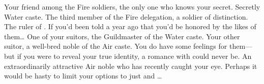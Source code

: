 \documentclass[char]{iron}
\begin{document}
\begin{contacts}
\contact{\cLieutenant{}} Your friend among the Fire soldiers, the only one
who knows your secret.  Secretly Water caste.
\contact{\cRealPriest{}} The third member of the Fire delegation, a soldier
of distinction.
\contact{\cRoyalty{}} The ruler of \sHomeCountry{}.  If you'd been told
a year ago that you'd be honored by the likes of them\ldots{}
\contact{\cGuildmaster{}} One of your suitors, the Guildmaster of the Water caste.
\contact{\cBastard{}} Your other suitor, a well-bred noble of the Air caste. You do have some feelings for them---but if you were to reveal your true identity, a romance with \cBastard{} could never be.
\contact{\cHotPerson{}} An extraordinarily attractive Air noble who has recently caught your eye. Perhaps it would be hasty to limit your options to just \cGuildmaster{} and \cBastard{}\ldots
\end{contacts}
\end{document}
